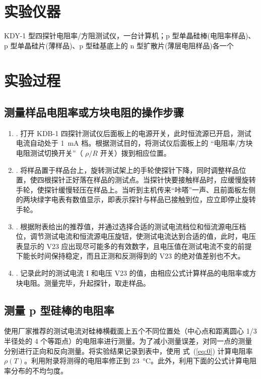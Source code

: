 \documentclass[a4paper,utf8]{article}
\newcommand{\seqref}[1]{式~(\ref{#1})}
\begin{document}
\section{实验仪器}%
    KDY-1 型四探针电阻率/方阻测试仪，一台计算机；p 型单晶硅棒(电阻率样品)、p 型单晶硅片(薄样品)、p 型硅基底上的 n 型扩散片(薄层电阻样品)各一个
\section{实验过程}%
    \subsection{测量样品电阻率或方块电阻的操作步骤}
    \begin{enumerate}
        \item{.} 打开 KDB-1 四探针测试仪后面板上的电源开关，此时恒流源已开启，测试电流自动处于 \SI{1}{\milli\ampere} 档。根据测试目的，将测试仪后面板上的 “电阻率/方块电阻测试切换开关”（ $\rho/R$ 开关）拨到相应位置。
        \item{.} 将样品置于样品台上，旋转测试架上的手轮使探针下降，同时调整样品位置，使四根探针正好落在样品的测试点。当探针快要接触样品时，应缓慢旋转手轮，使探针缓慢轻压在样品上。当听到主机传来“咔嗒”一声、且前面板左侧的两块绿字电表有数值显示，即表示探针与样品已接触到位，应立即停止旋转手轮。
        \item{.} 根据附表给出的推荐值，并通过选择合适的测试电流档位和恒流源电压档位，调节测试电流和恒流源电压旋钮，使测试电流达到合适的值，此时，电压表显示的 V23 应出现尽可能多的有效数字，且电压值在测试电流不变的前提下能长时间保持稳定，而且正测和反测得到的 V23 的绝对值差别也不大。
        \item{.} 记录此时的测试电流 I 和电压 V23 的值，由相应公式计算样品的电阻率或方块电阻。测量完毕，升起探针，取走样品。
    \end{enumerate}
    \subsection{测量 p 型硅棒的电阻率}
        使用厂家推荐的测试电流对硅棒横截面上五个不同位置处（中心点和距离圆心 1/3 半径处的 4 个等距点）的电阻率进行测量。为了减小测量误差，对同一点的测量分别进行正向和反向测量。将实验结果记录到表中，使用 \seqref{eq:0} 计算电阻率 $\rho (T)$。利用附录将测得的电阻率修正到 \SI{23}{\degreeCelsius}。此外，利用下面的公式计算电阻率分布的不均匀度。
\end{document}
